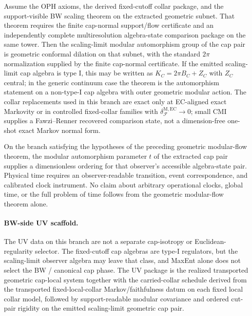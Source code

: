 \begin{theorem}
Assume the OPH axioms, the derived fixed-cutoff collar package, and the support-visible BW
scaling theorem on the extracted geometric subnet. That theorem requires the finite cap-normal
support/flow certificate and an independently complete multiresolution algebra-state comparison
package on the same tower. Then the scaling-limit modular
automorphism group of the cap pair is geometric conformal dilation on that
subnet, with the standard \(2\pi\) normalization supplied by the finite cap-normal certificate.
If the emitted scaling-limit cap algebra is type I, this may be written as
\(K_C=2\pi B_C+Z_C\) with \(Z_C\) central; in the generic continuum case the theorem is the
automorphism statement on a non-type-I cap algebra with outer geometric modular action. The collar
replacements used in this branch are exact only at EC-aligned exact Markovity
or in controlled fixed-collar families with
\(\delta^{\mathrm{M,EC}}_{\mathcal F}\to0\); small CMI supplies a
Fawzi--Renner recovered comparison state, not a dimension-free one-shot exact Markov normal form.
\end{theorem}

\begin{definition}
On the branch satisfying the hypotheses of the preceding geometric modular-flow theorem, the
modular automorphism parameter \(t\) of the extracted cap pair supplies a dimensionless ordering for
that observer's accessible algebra-state pair. Physical time requires an observer-readable
transition, event correspondence, and calibrated clock instrument. No claim about arbitrary
operational clocks, global time, or the full problem of time follows from the geometric modular-flow
theorem alone.
\end{definition}

\paragraph{BW-side UV scaffold.}
The UV data on this branch are not a separate cap-isotropy or Euclidean-regularity
selector. The fixed-cutoff cap algebras are type-I regulators, but the scaling-limit observer
algebra may leave that class, and MaxEnt alone does not select the BW / canonical cap phase. The
UV package is the realized transported geometric cap-local system together with the
carried-collar schedule derived from the transported fixed-local-collar Markov/faithfulness datum
on each fixed local collar model, followed by support-readable modular covariance and ordered
cut-pair rigidity on the emitted scaling-limit geometric cap pair.

